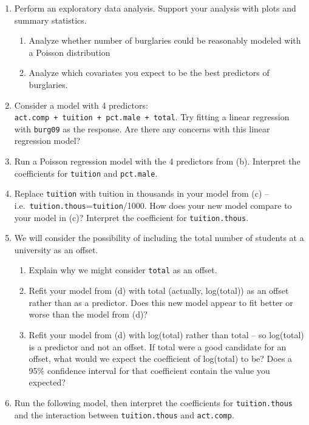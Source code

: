 \documentclass[
]{krantz}
\providecommand{\tightlist}{%
  \setlength{\itemsep}{0pt}\setlength{\parskip}{0pt}}
\begin{document}
\begin{enumerate}
  \begin{enumerate}
  \def\labelenumii{\alph{enumii}.}
  \tightlist
  \item
    Perform an exploratory data analysis. Support your analysis with plots and summary statistics.

    \begin{enumerate}
    \def\labelenumiii{\roman{enumiii}.}
    \tightlist
    \item
      Analyze whether number of burglaries could be reasonably modeled with a Poisson distribution
    \item
      Analyze which covariates you expect to be the best predictors of burglaries.
    \end{enumerate}
  \item
    Consider a model with 4 predictors: \texttt{act.comp\ +\ tuition\ +\ pct.male\ +\ total}. Try fitting a linear regression with \texttt{burg09} as the response. Are there any concerns with this linear regression model?
  \item
    Run a Poisson regression model with the 4 predictors from (b). Interpret the coefficients for \texttt{tuition} and \texttt{pct.male}.
  \item
    Replace \texttt{tuition} with tuition in thousands in your model from (c) -- i.e.~\texttt{tuition.thous}=\texttt{tuition}/1000. How does your new model compare to your model in (c)? Interpret the coefficient for \texttt{tuition.thous}.
  \item
    We will consider the possibility of including the total number of students at a university as an offset.

    \begin{enumerate}
    \def\labelenumiii{\roman{enumiii}.}
    \tightlist
    \item
      Explain why we might consider \texttt{total} as an offset.
    \item
      Refit your model from (d) with total (actually, log(total)) as an offset rather than as a predictor. Does this new model appear to fit better or worse than the model from (d)?
    \item
      Refit your model from (d) with log(total) rather than total -- so log(total) is a predictor and not an offset. If total were a good candidate for an offset, what would we expect the coefficient of log(total) to be? Does a 95\% confidence interval for that coefficient contain the value you expected?
    \end{enumerate}
  \item
    Run the following model, then interpret the coefficients for \texttt{tuition.thous} and the interaction between \texttt{tuition.thous} and \texttt{act.comp}.
  \end{enumerate}
\end{enumerate}
\end{document}
